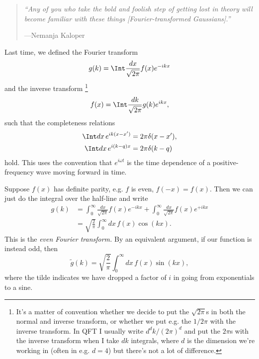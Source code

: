 \begin{quote}
    \textit{``Any of you who take the bold and foolish step of getting lost in theory will become familiar with these things [Fourier-transformed Gaussians].''}
    
    ---Nemanja Kaloper
\end{quote}
Last time, we defined the Fourier transform
\begin{equation}
    g(k) = \Int \frac{dx}{\sqrt{2\pi}}f(x) e^{-ikx}
\end{equation}
and the inverse transform%
    \footnote{It's a matter of convention whether we decide to put the $\sqrt{2\pi}$s in both the normal and inverse transform, or whether we put e.g. the $1/2\pi$ with the inverse transform. In QFT I usually write $d^dk/(2\pi)^d$ and put the $2\pi$s with the inverse transform when I take $dk$ integrals, where $d$ is the dimension we're working in (often in e.g. $d=4$) but there's not a lot of difference.}
\begin{equation}
    f(x) = \Int \frac{dk}{\sqrt{2\pi}} g(k) e^{ikx},
\end{equation}
such that the completeness relations
\begin{align}
    \Int dx \,e^{ik(x-x')}&=2\pi \delta(x-x'),\\
    \Int dx \,e^{i(k-q)x} &= 2\pi \delta(k-q)
\end{align}
hold. This uses the convention that $e^{i\omega t}$ is the time dependence of a positive-frequency wave moving forward in time.

Suppose $f(x)$ has definite parity, e.g. $f$ is even, $f(-x)=f(x)$. Then we can just do the integral over the half-line and write
\begin{align*}
    g(k) &= \int_0^\infty \frac{dx}{\sqrt{2\pi}}f(x) e^{-ikx} + \int_0^\infty \frac{dx}{\sqrt{2\pi}}f(x)e^{+ikx}\\
        &= \sqrt{\frac{2}{\pi}} \int_0^\infty dx\, f(x) \cos(kx).
\end{align*}
This is the \emph{even Fourier transform.} By an equivalent argument, if our function is instead odd, then
\begin{equation}
    \tilde g(k) = \sqrt{\frac{2}{\pi}} \int_0^\infty dx\, f(x) \sin(kx),
\end{equation}
where the tilde indicates we have dropped a factor of $i$ in going from exponentials to a sine.

